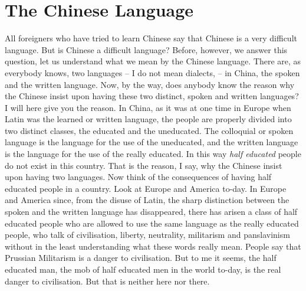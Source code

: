 
\chapter[The Chinese Language]
{The Chinese Language}



All foreigners who have tried to learn Chinese say that Chinese is a very difficult language. But is Chinese a difficult language?
Before, however, we answer this question, let us understand what we mean by the Chinese language. There are, as everybody knows, two languages
-- I do not mean dialects, -- in China,
the spoken and the written language.
Now, by the way,
does anybody know the reason why the Chinese insist upon having these two distinct,
spoken and written languages?
I will here give you the reason.
In China, as it was at one time in Europe when Latin was the learned or written language,
the people are properly divided into two distinct classes, the educated and the uneducated.
The colloquial or spoken language is the language for the use of the uneducated,
and the written language is the language for the use of the really educated.
In this way \emph{half educated} people do not exist in this country.
That is the reason, I say, why the Chinese insist upon having two languages. Now think of the consequences of having half educated people in a country.
Look at Europe and America to-day.
In Europe and America since, from the disuse of Latin, the sharp distinction between the spoken and the written language has disappeared, 
there has arisen a class of half educated people who are allowed to use the same language as the really educated people,
who talk of civilisation, liberty, neutrality, militarism and panslavinism without in the least understanding what these words really mean.
People say that Prussian Militarism is a danger to civilisation.
But to me it seems, the half educated man, the mob of half educated men in the world to-day,
is the real danger to civilisation.
But that is neither here nor there.

